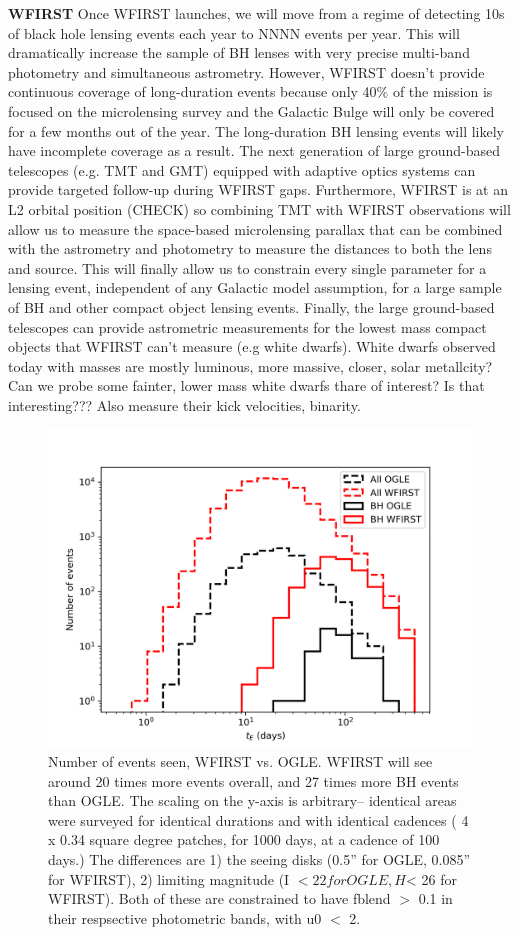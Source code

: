 \documentclass[11pt]{article}
\begin{document}
\textbf{WFIRST}
Once WFIRST launches, we will move from a regime of detecting 10s of black hole lensing events each year to NNNN events per year. This will dramatically increase the sample of BH lenses with very precise multi-band photometry and simultaneous astrometry. However, WFIRST doesn’t provide continuous coverage of long-duration events because only 40\% of the mission is focused on the microlensing survey and the Galactic Bulge will only be covered for a few months out of the year. The long-duration BH lensing events will likely have incomplete coverage as a result. The next generation of large ground-based telescopes (e.g. TMT and GMT) equipped with adaptive optics systems can provide targeted follow-up during WFIRST gaps. Furthermore, WFIRST is at an L2 orbital position (CHECK) so combining TMT with WFIRST observations will allow us to measure the space-based microlensing parallax that can be combined with the astrometry and photometry to measure the distances to both the lens and source. This will finally allow us to constrain every single parameter for a lensing event, independent of any Galactic model assumption, for a large sample of BH and other compact object lensing events.  Finally, the large ground-based telescopes can provide astrometric measurements for the lowest mass compact objects that WFIRST can’t measure (e.g white dwarfs).  White dwarfs observed today with masses are mostly luminous, more massive, closer, solar metallcity? Can we probe some fainter, lower mass white dwarfs thare of interest? Is that interesting??? 
Also measure their kick velocities, binarity.

\begin{figure}
    \centering
    \includegraphics[scale=0.5]{wfirst_v_ogle.png}
    \caption{Number of events seen, WFIRST vs. OGLE. WFIRST will see around 20 times more events overall, and 27 times more BH events than OGLE. The scaling on the y-axis is arbitrary-- identical areas were surveyed for identical durations and with identical cadences ( 4 x 0.34 square degree patches, for 1000 days, at a cadence of 100 days.) The differences are 1) the seeing disks (0.5'' for OGLE, 0.085'' for WFIRST), 2) limiting magnitude (I $< 22 for OGLE, H $< 26 for WFIRST). Both of these are constrained to have fblend $>$ 0.1 in their respsective photometric bands, with u0 $<$ 2.}
\end{figure}
\end{document}
